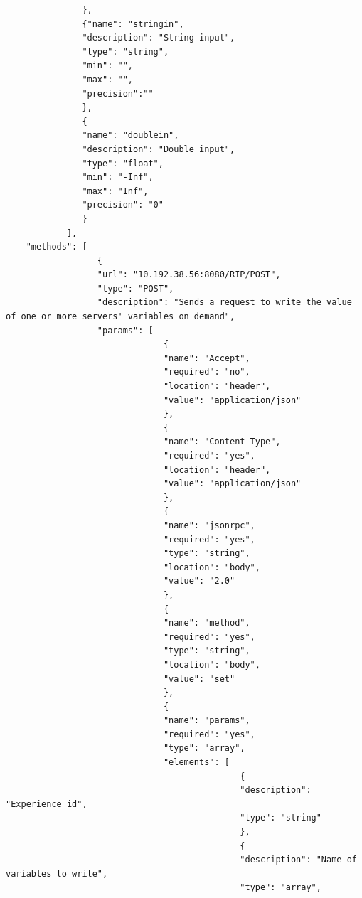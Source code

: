 \begin{lstlisting}
               },
               {"name": "stringin",
               "description": "String input",
               "type": "string",
               "min": "",
               "max": "",
               "precision":""
               },
               {
               "name": "doublein",
               "description": "Double input",
               "type": "float",
               "min": "-Inf",
               "max": "Inf",
               "precision": "0"
               }
            ],
    "methods": [
                  {
                  "url": "10.192.38.56:8080/RIP/POST",
                  "type": "POST",
                  "description": "Sends a request to write the value of one or more servers' variables on demand",
                  "params": [
                               {
                               "name": "Accept",
                               "required": "no",
                               "location": "header",
                               "value": "application/json"
                               },
                               {
                               "name": "Content-Type",
                               "required": "yes",
                               "location": "header",
                               "value": "application/json"
                               },
                               {
                               "name": "jsonrpc",
                               "required": "yes",
                               "type": "string",
                               "location": "body",
                               "value": "2.0"
                               },
                               {
                               "name": "method",
                               "required": "yes",
                               "type": "string",
                               "location": "body",
                               "value": "set"
                               },
                               {
                               "name": "params",
                               "required": "yes",
                               "type": "array",
                               "elements": [
                                              {
                                              "description": "Experience id",
                                              "type": "string"
                                              },
                                              {
                                              "description": "Name of variables to write",
                                              "type": "array",

\end{lstlisting}
